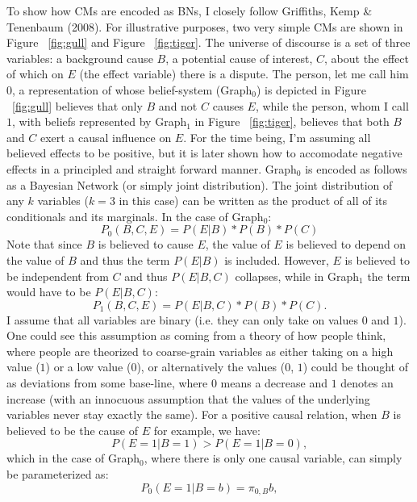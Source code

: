 \documentclass[12pt]{article}
\begin{document}
To show how CMs are encoded as BNs, I closely follow Griffiths, Kemp \& Tenenbaum (2008). For illustrative purposes, two very simple CMs are shown in Figure ~\ref{fig:gull} and Figure ~\ref{fig:tiger}. The universe of discourse is a set of three variables: a background cause $B$, a potential cause of interest, $C$, about the effect of which on $E$ (the effect variable) there is a dispute. The person, let me call him $0$, a representation of whose belief-system (Graph$_0$) is depicted in Figure ~\ref{fig:gull} believes that only $B$ and not $C$ causes $E$, while the person, whom I call $1$, with beliefs represented by Graph$_1$ in Figure ~\ref{fig:tiger}, believes that both $B$ and $C$ exert a causal influence on $E$. For the time being, I'm assuming all believed effects to be positive, but it is later shown how to accomodate negative effects in a principled and straight forward manner. Graph$_0$ is encoded as follows as a Bayesian Network (or simply joint distribution). The joint distribution of any $k$ variables ($k=3$ in this case) can be written as the product of all of its conditionals and its marginals. In the case of Graph$_0$:
$$P_0(B, C, E)= P(E | B)*P(B)*P(C)$$
Note that since $B$ is believed to cause $E$, the value of $E$ is believed to depend on the value of $B$ and thus the term $P(E | B)$ is included. However, $E$ is believed to be independent from $C$ and thus $P(E | B, C)$ collapses, while in Graph$_1$ the term would have to be $P(E | B, C)$:
$$P_1(B, C, E)= P(E | B, C)*P(B)*P(C).$$
I assume that all variables are binary (i.e. they can only take on values $0$ and $1$). One could see this assumption as coming from a theory of how people think, where people are theorized to coarse-grain variables as either taking on a high value ($1$) or a low value ($0$), or alternatively the values ($0$, $1$) could be thought of as deviations from some base-line, where $0$ means a decrease and $1$ denotes an increase (with an innocuous assumption that the values of the underlying variables never stay exactly the same).
For a positive causal relation, when $B$ is believed to be the cause of $E$ for example, we have:
$$P(E=1 | B=1) > P(E=1 | B=0),$$
which in the case of Graph$_0$, where there is only one causal variable, can simply be parameterized as:
$$P_0(E=1 | B=b) = \pi_{0, B}b,$$
\end{document}
